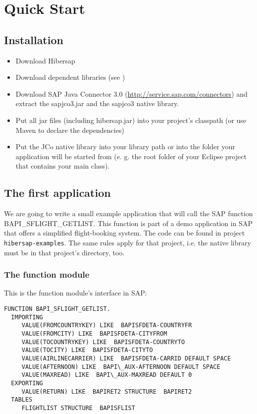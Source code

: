 \chapter{Quick Start}
\label{cha:QuickStart}

\section{Installation}

\begin{itemize}
  \item Download Hibersap 
  \item Download dependent libraries (see \urlHibersapDependencies)
  \item Download SAP Java Connector 3.0 (\url{http://service.sap.com/connectors}) and extract the sapjco3.jar and the
  sapjco3 native library. 
  \item Put all jar files (including hibersap.jar) into your project's classpath (or use Maven to declare the
  dependencies)
  \item Put the JCo native library into your library path or into the folder your application will be started
    from (e. g. the root folder of your Eclipse project that contains your main class).
\end{itemize} 


\section{The first application}

We are going to write a small example application that will call the SAP function BAPI\_SFLIGHT\_GETLIST.
This function is part of a demo application in SAP that offers a simplified flight-booking system.
The code can be found in project {\tt hibersap-examples}. The same rules apply for that project, i.e. the native
library must be in that project's directory, too.


\subsection{The function module}

This is the function module's interface in SAP:

\begin{Verbatim}[frame=single,label=The ABAP Function]
FUNCTION BAPI_SFLIGHT_GETLIST.
  IMPORTING
     VALUE(FROMCOUNTRYKEY) LIKE  BAPISFDETA-COUNTRYFR
     VALUE(FROMCITY) LIKE  BAPISFDETA-CITYFROM
     VALUE(TOCOUNTRYKEY) LIKE  BAPISFDETA-COUNTRYTO
     VALUE(TOCITY) LIKE  BAPISFDETA-CITYTO
     VALUE(AIRLINECARRIER) LIKE  BAPISFDETA-CARRID DEFAULT SPACE
     VALUE(AFTERNOON) LIKE  BAPI\_AUX-AFTERNOON DEFAULT SPACE
     VALUE(MAXREAD) LIKE  BAPI\_AUX-MAXREAD DEFAULT 0
  EXPORTING
     VALUE(RETURN) LIKE  BAPIRET2 STRUCTURE  BAPIRET2
  TABLES
     FLIGHTLIST STRUCTURE  BAPISFLIST
\end{Verbatim}

